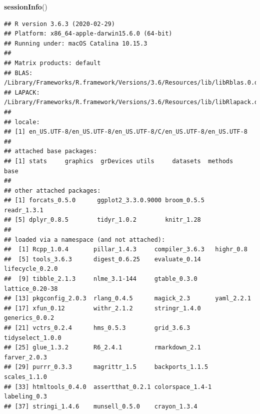 \documentclass[]{article}
\newenvironment{Shaded}{\begin{snugshade}}{\end{snugshade}}
\newcommand{\KeywordTok}[1]{\textcolor[rgb]{0.13,0.29,0.53}{\textbf{#1}}}
\newcommand{\NormalTok}[1]{#1}
\begin{document}
\begin{Shaded}
\begin{Highlighting}[]
\KeywordTok{sessionInfo}\NormalTok{()}
\end{Highlighting}
\end{Shaded}

\begin{verbatim}
## R version 3.6.3 (2020-02-29)
## Platform: x86_64-apple-darwin15.6.0 (64-bit)
## Running under: macOS Catalina 10.15.3
## 
## Matrix products: default
## BLAS:   /Library/Frameworks/R.framework/Versions/3.6/Resources/lib/libRblas.0.dylib
## LAPACK: /Library/Frameworks/R.framework/Versions/3.6/Resources/lib/libRlapack.dylib
## 
## locale:
## [1] en_US.UTF-8/en_US.UTF-8/en_US.UTF-8/C/en_US.UTF-8/en_US.UTF-8
## 
## attached base packages:
## [1] stats     graphics  grDevices utils     datasets  methods   base     
## 
## other attached packages:
## [1] forcats_0.5.0      ggplot2_3.3.0.9000 broom_0.5.5        readr_1.3.1       
## [5] dplyr_0.8.5        tidyr_1.0.2        knitr_1.28        
## 
## loaded via a namespace (and not attached):
##  [1] Rcpp_1.0.4       pillar_1.4.3     compiler_3.6.3   highr_0.8       
##  [5] tools_3.6.3      digest_0.6.25    evaluate_0.14    lifecycle_0.2.0 
##  [9] tibble_2.1.3     nlme_3.1-144     gtable_0.3.0     lattice_0.20-38 
## [13] pkgconfig_2.0.3  rlang_0.4.5      magick_2.3       yaml_2.2.1      
## [17] xfun_0.12        withr_2.1.2      stringr_1.4.0    generics_0.0.2  
## [21] vctrs_0.2.4      hms_0.5.3        grid_3.6.3       tidyselect_1.0.0
## [25] glue_1.3.2       R6_2.4.1         rmarkdown_2.1    farver_2.0.3    
## [29] purrr_0.3.3      magrittr_1.5     backports_1.1.5  scales_1.1.0    
## [33] htmltools_0.4.0  assertthat_0.2.1 colorspace_1.4-1 labeling_0.3    
## [37] stringi_1.4.6    munsell_0.5.0    crayon_1.3.4
\end{verbatim}
\end{document}
